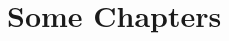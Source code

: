 \documentclass[12pt,oneside]{book}
\begin{document}
    \tableofcontents
    \chapter{Some Chapters}
\end{document}
